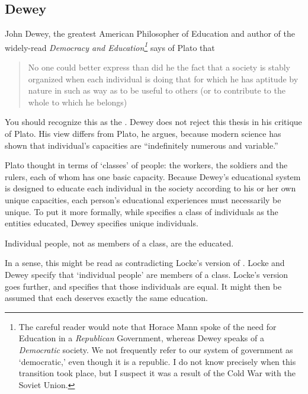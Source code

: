 \subsection{Dewey}
\label{dewey}

John Dewey, the greatest American Philosopher of Education and author of the widely-read \emph{Democracy and Education\footnote{The careful reader would note that Horace Mann spoke of the need for Education in a \emph{Republican} Government, whereas Dewey speaks of a \emph{Democratic} society. We not frequently refer to our system of government as `democratic,' even though it is a republic. I do not know precisely when this transition took place, but I suspect it was a result of the Cold War with the Soviet Union.}} says of Plato that

\begin{quote}

No one could better express than did he the fact that a society is stably organized when each individual is doing that for which he has aptitude by nature in such as way as to be useful to others (or to contribute to the whole to which he belongs) ~\citep[p. 102]{Dewey:1916tl}
\end{quote}

You should recognize this as the . Dewey does not reject this thesis in his critique of Plato. His view differs from Plato, he argues, because modern science has shown that individual's capacities are ``indefinitely numerous and variable.'' 

Plato thought in terms of `classes' of people: the workers, the soldiers and the rulers, each of whom has one basic capacity. Because Dewey's educational system is designed to educate each individual in the society according to his or her own unique capacities, each person's educational experiences must necessarily be unique. To put it more formally, while  specifies a class of individuals as the entities educated, Dewey specifies unique individuals.
\begin{entities}\label{deweyentities}
Individual people, not as members of a class, are the educated.
\end{entities} 

In a sense, this might be read as contradicting Locke's version of . Locke and Dewey specify that `individual people' are members of a class. Locke's version goes further, and specifies that those individuals are equal. It might then be assumed that each deserves exactly the same education.

